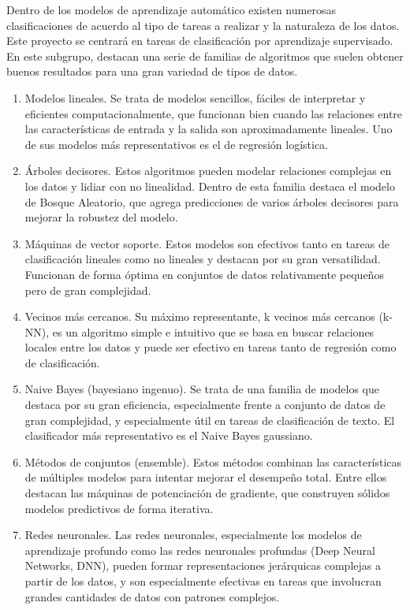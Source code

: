 Dentro de los modelos de aprendizaje automático existen numerosas clasificaciones de acuerdo al tipo de tareas a realizar y la naturaleza de los datos. Este proyecto se centrará en tareas de clasificación por aprendizaje supervisado. En este subgrupo, destacan una serie de familias de algoritmos que suelen obtener buenos resultados para una gran variedad de tipos de datos.
\begin{enumerate}
    \item Modelos lineales. Se trata de modelos sencillos, fáciles de interpretar y eficientes computacionalmente, que funcionan bien cuando las relaciones entre las características de entrada y la salida son aproximadamente lineales. Uno de sus modelos más representativos es el de regresión logística.
    \item Árboles decisores. Estos algoritmos pueden modelar relaciones complejas en los datos y lidiar con no linealidad. Dentro de esta familia destaca el modelo de Bosque Aleatorio, que agrega predicciones de varios árboles decisores para mejorar la robustez del modelo.
    \item Máquinas de vector soporte. Estos modelos son efectivos tanto en tareas de clasificación lineales como no lineales y destacan por su gran versatilidad. Funcionan de forma óptima en conjuntos de datos relativamente pequeños pero de gran complejidad.
    \item Vecinos más cercanos. Su máximo representante, k vecinos más cercanos (k-NN), es un algoritmo simple e intuitivo que se basa en buscar relaciones locales entre los datos y puede ser efectivo en tareas tanto de regresión como de clasificación.
    \item Naive Bayes (bayesiano ingenuo). Se trata de una familia de modelos que destaca por su gran eficiencia, especialmente frente a conjunto de datos de gran complejidad, y especialmente útil en tareas de clasificación de texto. El clasificador más representativo es el Naive Bayes gaussiano.
    \item Métodos de conjuntos (ensemble). Estos métodos combinan las características de múltiples modelos para intentar mejorar el desempeño total. Entre ellos destacan las máquinas de potenciación de gradiente, que construyen sólidos modelos predictivos de forma iterativa.
    \item Redes neuronales. Las redes neuronales, especialmente los modelos de aprendizaje profundo como las redes neuronales profundas (Deep Neural Networks, DNN), pueden formar representaciones jerárquicas complejas a partir de los datos, y son especialmente efectivas en tareas que involucran grandes cantidades de datos con patrones complejos.
\end{enumerate}

